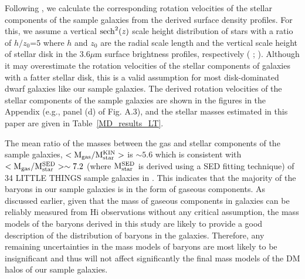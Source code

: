 \documentclass[natbib209]{emulateapj}
\begin{document}
Following \cite{Oh_2011a}, we calculate the corresponding rotation velocities
of the stellar components of the sample galaxies from the derived surface
density profiles. For this, we assume a vertical $\rm {sech}^{2}({\it z})$ scale height
distribution of stars with a ratio of $h/z_{0}$=$5$ where $h$ and $z_{0}$ are the radial
scale length and the vertical scale height of stellar disk in the 3.6$\mu$m surface
brightness profiles, respectively (\citeauthor{van_der_Kruit_1981}
\citeyear{van_der_Kruit_1981}; \citeauthor{Kregel_2002} \citeyear{Kregel_2002}).
Although it may overestimate the rotation velocities of the stellar
components of galaxies with a fatter stellar disk, this is a valid assumption
for most disk-dominated dwarf galaxies like our sample galaxies. The
derived rotation velocities of the stellar components of the sample galaxies are
shown in the figures in the Appendix (e.g., panel (d) of Fig. A.3), and the
stellar masses estimated in this paper are given in Table~\ref{MD_results_LT}.

The mean ratio of the masses between the gas and stellar components of the
sample galaxies, $\rm <M_{gas}/M_{star}^{KIN}>$ is $\sim 5.6$ which is consistent
with $\rm <M_{gas}/M_{star}^{SED}> \sim7.2$ (where $\rm M_{star}^{SED}$ is derived
using a SED fitting technique) of 34 LITTLE THINGS sample galaxies in \cite{Zhang_2012}. This indicates that the
majority of the baryons in our sample galaxies is in the form of gaseous
components. As discussed earlier, given that the mass of gaseous components in
galaxies can be reliably measured from H{\sc i} observations without any critical
assumption, the mass models of the baryons derived in this study are likely to
provide a good description of the distribution of baryons in the
galaxies. Therefore, any remaining uncertainties in the mass models of baryons
are most likely to be insignificant and thus will not affect significantly the final mass
models of the DM halos of our sample galaxies.
\end{document}
